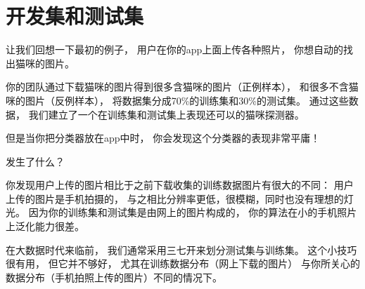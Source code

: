 \chapter{开发集和测试集}

\iffalse
Lets return to our earlier cat pictures example: You run a mobile app, and users are
uploading pictures of many different things to your app. You want to automatically find the
cat pictures.
Your team gets a large training set by downloading pictures of cats (positive examples) and
non-cats (negative examples) off different websites. They split the dataset 70%
training and test sets. Using this data, they build a cat detector that works well on the
training and test sets.
But when you deploy this classifier into the mobile app, you find that the performance is
really poor!
\fi

让我们回想一下最初的例子，
用户在你的app上面上传各种照片，
你想自动的找出猫咪的图片。

你的团队通过下载猫咪的图片得到很多含猫咪的图片（正例样本），
和很多不含猫咪的图片（反例样本），
将数据集分成70\%的训练集和30\%的测试集。
通过这些数据，
我们建立了一个在训练集和测试集上表现还可以的猫咪探测器。

但是当你把分类器放在app中时，
你会发现这个分类器的表现非常平庸！

\iffalse
What happened?
You figure out that the pictures users are uploading have a different look than the website
images that make up your training set: Users are uploading pictures taken with mobile
phones, which tend to be lower resolution, blurrier, and have less ideal lighting. Since your
training/test sets were made of website images, your algorithm did not generalize well to the
actual distribution you care about of smartphone pictures.
Before the modern era of big data, it was a common rule in machine learning to use a
random 70%
bad idea in more and more applications where the training distribution (website images in
our example above) is different from the distribution you ultimately care about (mobile
phone images).
\fi

发生了什么？

你发现用户上传的图片相比于之前下载收集的训练数据图片有很大的不同：
用户上传的图片是手机拍摄的，
与之相比分辨率更低，很模糊，同时也没有理想的灯光。
因为你的训练集和测试集是由网上的图片构成的，
你的算法在小的手机照片上泛化能力很差。

在大数据时代来临前，
我们通常采用三七开来划分测试集与训练集。
这个小技巧很有用，
但它并不够好，
尤其在训练数据分布（网上下载的图片）
与你所关心的数据分布（手机拍照上传的图片）不同的情况下。

